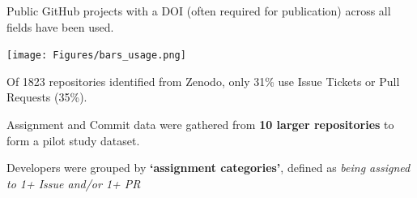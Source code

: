 \documentclass[25pt, a0paper, landscape, margin=10mm, innermargin=15mm, blockverticalspace=10mm, subcolspace=7mm, dvipsnames]{tikzposter} %
\begin{document}
\begin{columns}
{\begin{multicols}{2}
{        Public GitHub projects with a DOI (often required for publication) across all fields have been used.
        \vspace{0.4em}
        \begin{tikzfigure}[]
            \texttt{[image: Figures/bars\_usage.png]}
        \end{tikzfigure}
        
        Of 1823 repositories identified from Zenodo, only 31\% use Issue Tickets or Pull Requests (35\%).}
    {\fontsize{32}{32}\selectfont
    \begin{tcolorbox}[colframe=white,colback=epccnavy!08, linewidth=0.8*linewidth]{   
        Assignment and Commit data were gathered from \textbf{10 larger repositories} to form a pilot study dataset. 
        \par
        Developers were grouped by \textbf{`assignment categories'}, defined as \textit{being assigned to 1+ Issue and/or 1+ PR}
    }
   \end{tcolorbox}}
    \end{multicols}
}


\end{columns}
\end{document}

